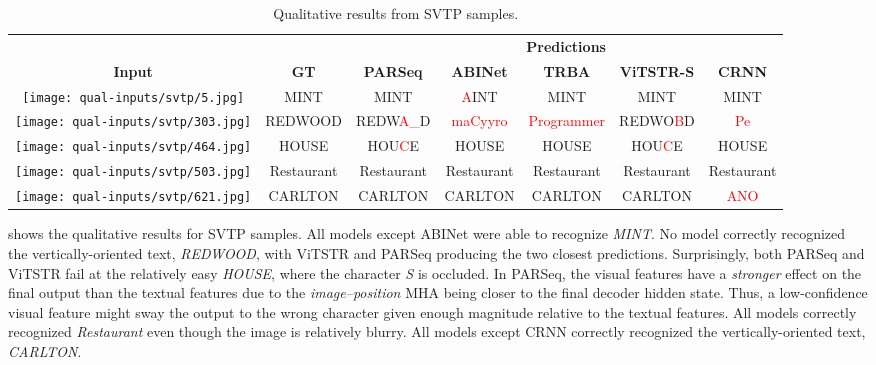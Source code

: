 \begin{table*}[htbp]
  \centering
  \scriptsize
  \setlength\tabcolsep{3pt}
  \caption{Qualitative results from SVTP samples.}
  \begin{tabular}{ c c c c c c c }
    \toprule
    & & \multicolumn{5}{c}{\textbf{Predictions}} \\
    \cmidrule{3-7}
    \textbf{Input} & \textbf{GT} & \textbf{PARSeq} & \textbf{ABINet} & \textbf{TRBA} & \textbf{ViTSTR-S} & \textbf{CRNN} \\
    \midrule
    \texttt{[image: qual-inputs/svtp/5.jpg]} & MINT & MINT & \textcolor{red}{A}INT & MINT & MINT & MINT \\
    \texttt{[image: qual-inputs/svtp/303.jpg]} & REDWOOD & REDW\textcolor{red}{A\_}D & \textcolor{red}{maCyyro} & \textcolor{red}{Programmer} & REDWO\textcolor{red}{B}D & \textcolor{red}{Pe} \\
    \texttt{[image: qual-inputs/svtp/464.jpg]} & HOUSE & HOU\textcolor{red}{C}E & HOUSE & HOUSE & HOU\textcolor{red}{C}E & HOUSE \\
    \texttt{[image: qual-inputs/svtp/503.jpg]} & Restaurant & Restaurant & Restaurant & Restaurant & Restaurant & Restaurant \\
    \texttt{[image: qual-inputs/svtp/621.jpg]} & CARLTON & CARLTON & CARLTON & CARLTON & CARLTON & \textcolor{red}{ANO} \\
    \bottomrule
  \end{tabular}
  \label{tab:qual-results-svtp}
\end{table*}

 shows the qualitative results for SVTP samples. All models except ABINet were able to recognize \textit{MINT}. No model correctly recognized the vertically-oriented text, \textit{REDWOOD}, with ViTSTR and PARSeq producing the two closest predictions. Surprisingly, both PARSeq and ViTSTR fail at the relatively easy \textit{HOUSE}, where the character \textit{S} is occluded. In PARSeq, the visual features have a \textit{stronger} effect on the final output than the textual features due to the \textit{image--position} MHA being closer to the final decoder hidden state. Thus, a low-confidence visual feature might sway the output to the wrong character given enough magnitude relative to the textual features. All models correctly recognized \textit{Restaurant} even though the image is relatively blurry. All models except CRNN correctly recognized the vertically-oriented text, \textit{CARLTON}.


